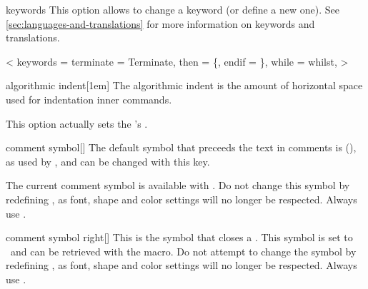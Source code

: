 \documentclass[a4paper, 11pt]{article}
\begin{document}
\begin{option}{keywords}{}
    This option allows to change a keyword (or define a new one). See \cref{sec:languages-and-translations} for more information on keywords and translations.
\end{option}

\begin{tcblisting}{}
    \begin{algorithmic}<
            keywords = {
                terminate = Terminate, %
                then = \{, %
                endif = \}, %
                while = whilst,  %
            }
        >
        \While{\True}
            \EndIf
        \EndWhile
    \end{algorithmic}
\end{tcblisting}

\begin{option}{algorithmic indent}{}[1em]
    The algorithmic indent is the amount of horizontal space used for indentation inner commands.

    This option actually sets the 's .
\end{option}

\begin{option}{comment symbol}{}[]
    The default symbol that preceeds the text in comments is  (\CommentSymbol), as used by , and can be changed with this key.

    The current comment symbol is available with . Do not change this symbol by redefining , as font, shape and color settings will no longer be respected. Always use .
\end{option}

\begin{option}{comment symbol right}{}[]
    This is the symbol that closes a . This symbol is set to \CommentSymbolRight\ and can be retrieved with the  macro. Do not attempt to change the symbol by redefining , as font, shape and color settings will no longer be respected. Always use .
\end{option}
\end{document}
